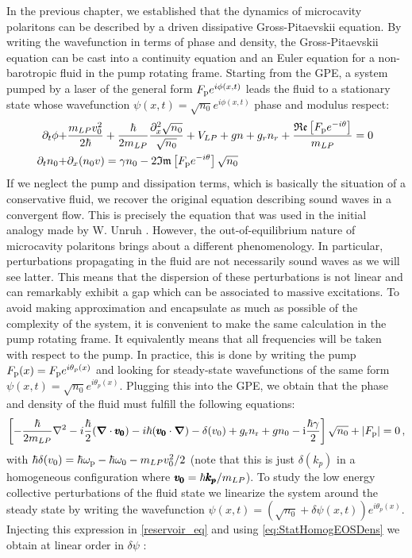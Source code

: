In the previous chapter, we established that the dynamics of microcavity polaritons can be described by a driven dissipative Gross-Pitaevskii equation.
By writing the wavefunction in terms of phase and density, the Gross-Pitaevskii equation can be cast into a continuity equation and an Euler equation for a non-barotropic fluid in the pump rotating frame. Starting from the GPE, a system pumped by a laser of the general form $F_{\mathrm{p}}e^{i\phi(x,t)}$ leads the fluid to a stationary state whose wavefunction $\psi(x,t)=\sqrt{n_0}e^{i\phi(x,t)}$ phase and modulus respect:
    \begin{align}
    \partial_t \phi +& \frac{m_{LP} v_0^2}{2\hbar}+\frac{\hbar}{2m_{LP}}\frac{\partial_x^2\sqrt{n_0}}{\sqrt{n_0}}+V_{LP}+gn+g_rn_r+\frac{\mathfrak{Re}\left[F_{\mathrm{p}}e^{-i\theta}\right]}{m_{LP}}=0\,\\
    \partial_t n_0 +& \partial_x(n_0v)= \gamma n_0 -2\mathfrak{Im}\left[F_{\mathrm{p}}e^{-i\theta}\right]\sqrt{n_0}
    \end{align}
    \label{eq:continuity}
If we neglect the pump and dissipation terms, which is basically the situation of a conservative fluid, we recover the original equation describing sound waves in a convergent flow. This is precisely the equation that was used in the initial analogy made by W. Unruh \cite{unruh_experimental_1981}.
However, the out-of-equilibrium nature of microcavity polaritons brings about a different phenomenology. In particular, perturbations propagating in
the fluid are not necessarily sound waves as we will see latter. This means that the dispersion of these perturbations is not linear and can remarkably exhibit a gap which can be associated to massive excitations. To avoid making approximation and encapsulate as much as possible of the complexity of the system, it is convenient to make the same calculation in the pump rotating frame. It equivalently means that all frequencies
will be taken with respect to the pump. In practice, this is done by writing the pump $F_{\mathrm{p}}(x)= F_{\mathrm{p}}e^{i\theta_p(x)}$ and looking for steady-state wavefunctions of the same form $\psi(x,t)=\sqrt{n_0}e^{i\theta_p(x)}$. Plugging this into the GPE, we obtain that the phase and density of the fluid must fulfill the following equations:
\begin{equation}
    \left[-\frac{\hbar}{2m_{LP}}\nabla^2-i\frac{\hbar}{2}(\boldsymbol{\nabla}\cdot\pmb{v_0}) -i\hbar(\pmb{v_0}\cdot\boldsymbol{\nabla})- \delta(v_0)+g_{\rm r}n_{\rm r}+g n_0-\mathrm{i}\frac{\hbar\gamma}{2}\right]\sqrt{n_0}+|F_{\mathrm{p}}|=0\,,
        \label{eq:StatHomogEOSDens}
\end{equation}
with $\hbar \delta(v_0)=\hbar\omega_{\mathrm{p}}-\hbar\omega_0-m_{LP} v_0^2/2$ (note that this is just $\delta(k_p)$ in a homogeneous configuration where $\pmb{v_0}=\hbar\pmb{k_p}/m_{LP}$).
To study the low energy collective perturbations of the fluid state we linearize the system around the steady state by writing the wavefunction
$\psi(x,t)=(\sqrt{n_0}+\delta\psi(x,t))e^{i\theta_p(x)}$. Injecting this expression in \autoref{reservoir_eq} and using \autoref{eq:StatHomogEOSDens} we obtain at linear order in $\delta\psi$ :

